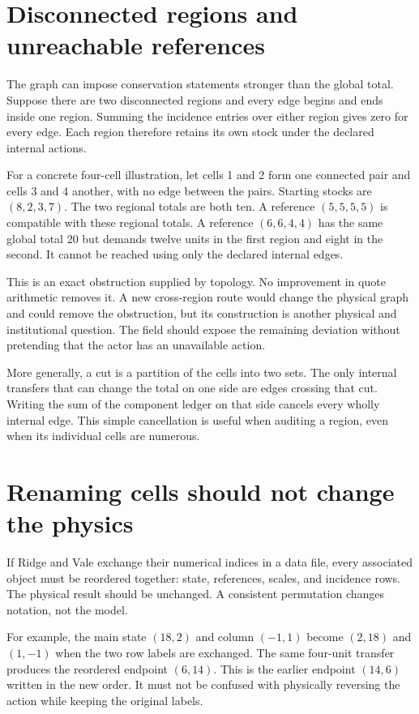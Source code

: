 \section{Disconnected regions and unreachable references}
The graph can impose conservation statements stronger than the global total. Suppose there are two disconnected regions and every edge begins and ends inside one region. Summing the incidence entries over either region gives zero for every edge. Each region therefore retains its own stock under the declared internal actions.

For a concrete four-cell illustration, let cells 1 and 2 form one connected pair and cells 3 and 4 another, with no edge between the pairs. Starting stocks are \((8,2,3,7)\). The two regional totals are both ten. A reference \((5,5,5,5)\) is compatible with these regional totals. A reference \((6,6,4,4)\) has the same global total 20 but demands twelve units in the first region and eight in the second. It cannot be reached using only the declared internal edges.

This is an exact obstruction supplied by topology. No improvement in quote arithmetic removes it. A new cross-region route would change the physical graph and could remove the obstruction, but its construction is another physical and institutional question. The field should expose the remaining deviation without pretending that the actor has an unavailable action.

More generally, a cut is a partition of the cells into two sets. The only internal transfers that can change the total on one side are edges crossing that cut. Writing the sum of the component ledger on that side cancels every wholly internal edge. This simple cancellation is useful when auditing a region, even when its individual cells are numerous.

\section{Renaming cells should not change the physics}
If Ridge and Vale exchange their numerical indices in a data file, every associated object must be reordered together: state, references, scales, and incidence rows. The physical result should be unchanged. A consistent permutation changes notation, not the model.

For example, the main state \((18,2)\) and column \((-1,1)\) become \((2,18)\) and \((1,-1)\) when the two row labels are exchanged. The same four-unit transfer produces the reordered endpoint \((6,14)\). This is the earlier endpoint \((14,6)\) written in the new order. It must not be confused with physically reversing the action while keeping the original labels.

